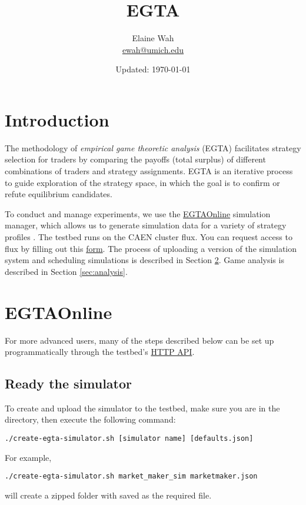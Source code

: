 \documentclass[11pt]{article}
\begin{document}
	
\title{EGTA}
\author{
  Elaine Wah \\
  \href{mailto:ewah@umich.edu}{ewah@umich.edu}
}
\date{Updated: \today}
\maketitle

\section{Introduction}

The methodology of \emph{empirical game theoretic analysis} (EGTA) \citep{Wellman2006} facilitates strategy selection for traders by comparing the payoffs (total surplus) of different combinations of traders and strategy assignments. EGTA is an iterative process to guide exploration of the strategy space, in which the goal is to confirm or refute equilibrium candidates.

To conduct and manage experiments, we use the \href{http://egtaonline.eecs.umich.edu}{EGTAOnline} simulation manager, which allows us to generate simulation data for a variety of strategy profiles \citep{Cassell2013}.
The testbed runs on the CAEN cluster flux. You can request access to flux by filling out this \href{https://docs.google.com/a/umich.edu/forms/d/1u9hdqdinnNC9iF6If2xV0C06knbP_TKJBIzfCSnWw6I/viewform}{form}.
The process of uploading a version of the simulation system and scheduling simulations is described in Section \ref{sec:egta}.
Game analysis is described in Section \ref{sec:analysis}.

\section{EGTAOnline}\label{sec:egta}

For more advanced users, many of the steps described below can be set up programmatically through the testbed's \href{https://github.com/bcassell/egtaonline3/wiki/API}{HTTP API}.

\subsection{Ready the simulator}
To create and upload the simulator to the testbed, make sure you are in the  directory, then execute the following command:
\begin{verbatim}
./create-egta-simulator.sh [simulator name] [defaults.json]
\end{verbatim}
For example, 
\begin{verbatim}
./create-egta-simulator.sh market_maker_sim marketmaker.json
\end{verbatim}
will create a zipped folder  with  saved as the required  file. 
\end{document}
